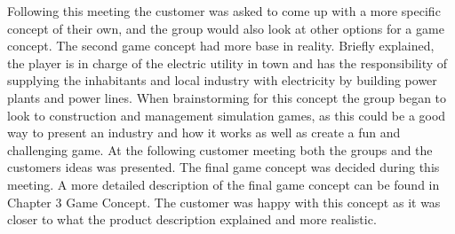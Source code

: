 Following this meeting the customer was asked to come up with a more specific concept of their own, and the group would also look at other options for a game concept. The second game concept had more base in reality. Briefly explained, the player is in charge of the electric utility in town and has the responsibility of supplying the inhabitants and local industry with electricity by building power plants and power lines. When brainstorming for this concept the group began to look to construction and management simulation games, as this could be a good way to present an industry and how it works as well as create a fun and challenging game. At the following customer meeting both the groups and the customers ideas was presented. The final game concept was decided during this meeting. A more detailed description of the final game concept can be found in Chapter 3 Game Concept. The customer was happy with this concept as it was closer to what the product description explained and more realistic.

